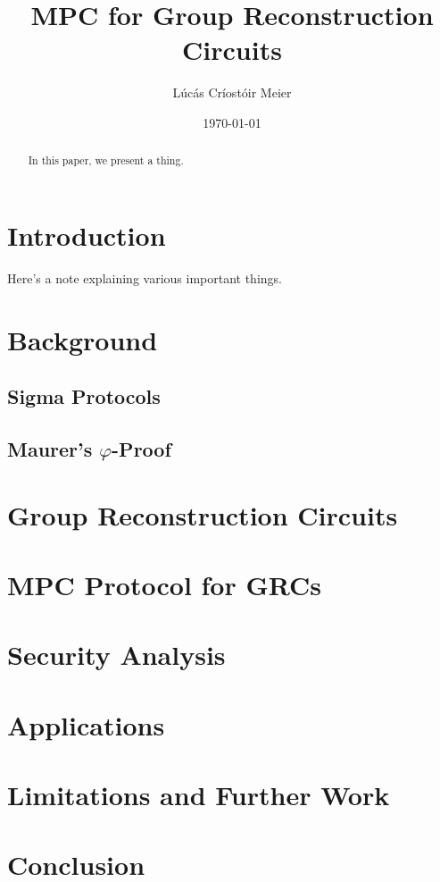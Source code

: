 

\date{\today}
\title{MPC for Group Reconstruction Circuits}
\author{Lúcás Críostóir Meier}



\maketitle

\begin{abstract}
    In this paper, we present a thing.
\end{abstract}

\section{Introduction}

\begin{note}
    Here's a note explaining various important things.
\end{note}

\section{Background}

\subsection{Sigma Protocols}

\subsection{Maurer's $\varphi$-Proof}

\section{Group Reconstruction Circuits}

\section{MPC Protocol for GRCs}

\section{Security Analysis}

\section{Applications}

\section{Limitations and Further Work}

\section{Conclusion}


\footnotesize 

